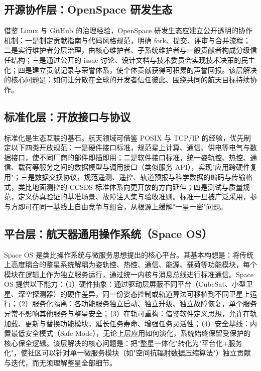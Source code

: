 \documentclass[UTF8,a4paper,zihao=-4]{ctexart}
\begin{document}
\subsection{开源协作层：OpenSpace 研发生态}
借鉴 Linux 与 GitHub 的治理经验，OpenSpace 研发生态应建立公开透明的协作机制：一是制定贡献指南与代码风格规范，明确 fork、提交、评审与合并流程；二是实行维护者分层治理，由核心维护者、子系统维护者与一般贡献者构成分级信任结构；三是通过公开的 issue 讨论、设计文档与技术委员会实现技术决策的民主化；四是建立贡献记录与荣誉体系，使个体贡献获得可积累的声誉回报。该层解决的核心问题是：如何让分散在全球的开发者信任彼此、围绕共同的航天目标持续协作。

\subsection{标准化层：开放接口与协议}
标准化是生态互联的基石。航天领域可借鉴 POSIX 与 TCP/IP 的经验，优先制定以下四类开放规范：一是硬件接口标准，规范星上计算、通信、供电等电气与数据接口，使不同厂商的部件即插即用；二是软件接口标准，统一姿轨控、热控、通信、载荷等服务之间的数据模型与调用接口（类似服务 API），实现"应用跨硬件复用"；三是数据交换协议，规范遥测、遥控、轨道预报与科学数据的编码与传输格式，类比地面测控的 CCSDS 标准体系向更开放的方向延伸；四是测试与质量规范，定义仿真验证的基准场景、故障注入集与验收准则。标准一旦被广泛采用，参与方即可在同一基线上自由竞争与组合，从根源上缓解"一星一密"问题。

\subsection{平台层：航天器通用操作系统（Space OS）}
Space OS 是类比操作系统与微服务思想提出的核心平台。其基本构想是：将传统上高度耦合的整星系统解耦为姿轨控、热控、通信、能源、载荷等功能模块，每个模块在逻辑上作为独立服务运行，通过统一内核与消息总线进行标准通信。Space OS 提供以下能力：（1）硬件抽象：通过驱动层屏蔽不同平台（CubeSat、小型卫星、深空探测器）的硬件差异，同一份姿态控制或轨道算法可移植到不同卫星上运行；（2）服务化隔离：各功能服务独立启动、独立升级、独立故障恢复，单个服务异常不影响其他服务与整星安全；（3）在轨可重构：借鉴软件定义思想，允许在轨加载、更新与替换功能模块，延长任务寿命、增强任务灵活性；（4）安全基线：内置最低安全模式（Safe Mode），无论上层应用如何演化，系统始终保留受保护的核心保全逻辑。该层解决的核心问题是：把"整星一体化"转化为"平台化+服务化"，使社区可以针对单一微服务模块（如"空间抗辐射数据压缩算法"）独立贡献与迭代，而无须理解整星全部细节。
\end{document}
